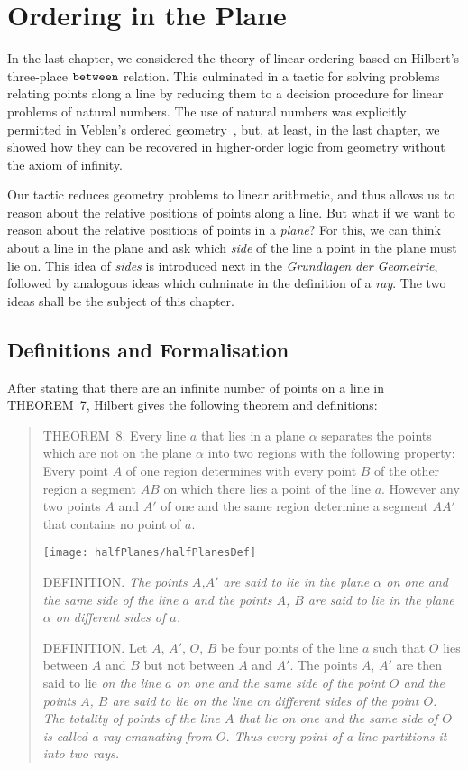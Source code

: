 \chapter{Ordering in the Plane}\label{chapter:HalfPlanes}
In the last chapter, we considered the theory of linear-ordering based on Hilbert's three-place $\texttt{between}$ relation. This culminated in a tactic for solving problems relating points along a line by reducing them to a decision procedure for linear problems of natural numbers. The use of natural numbers was explicitly permitted in Veblen's ordered geometry~\cite{Veblenphd}, but, at least, in the last chapter, we showed how they can be recovered in higher-order logic from geometry without the axiom of infinity.

Our tactic reduces geometry problems to linear arithmetic, and thus allows us to reason about the relative positions of points along a line. But what if we want to reason about the relative positions of points in a \emph{plane}? For this, we can think about a line in the plane and ask which \emph{side} of the line a point in the plane must lie on. This idea of \emph{sides} is introduced next in the \emph{Grundlagen der Geometrie}, followed by analogous ideas which culminate in the definition of a \emph{ray}. The two ideas shall be the subject of this chapter. 

\section{Definitions and Formalisation}
After stating that there are an infinite number of points on a line in THEOREM~7, Hilbert gives the following theorem and definitions:

\begin{quotation}
THEOREM~8. Every line $a$ that lies in a plane $\alpha$ separates the points which are not on the plane $\alpha$ into two regions with the following property: Every point $A$ of one region determines with every point $B$ of the other region a segment $AB$ on which there lies a point of the line $a$. However any two points $A$ and $A'$ of one and the same region determine a segment $AA'$ that contains no point of $a$.

\begin{center}\texttt{[image: halfPlanes/halfPlanesDef]}\end{center}

DEFINITION. \emph{The points $A$,$A'$ are said to lie in the plane $\alpha$ on one and the same side of the line $a$ and the points $A$, $B$ are said to lie in the plane $\alpha$ on different sides of $a$.}

DEFINITION. Let $A$, $A'$, $O$, $B$ be four points of the line $a$ such that $O$ lies between $A$ and $B$ but not between $A$ and $A'$. The points $A$, $A'$ are then said to lie \emph{on the line $a$ on one and the same side of the point $O$ and the points $A$, $B$ are said to lie on the line on different sides of the point $O$. The totality of points of the line $A$ that lie on one and the same side of $O$ is called a \emph{ray} emanating from $O$. Thus every point of a line partitions it into two rays.}
\end{quotation}

